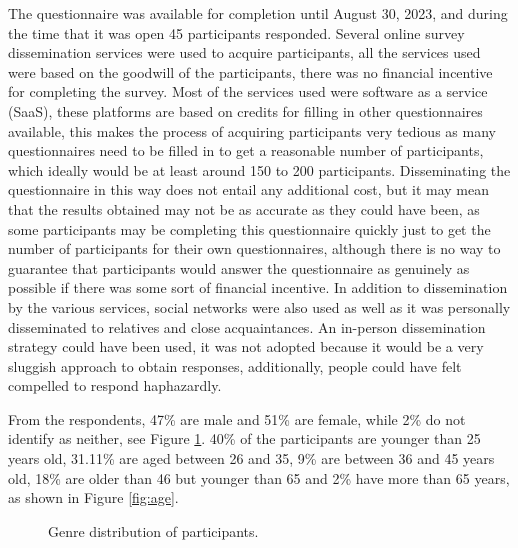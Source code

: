 The questionnaire was available for completion until August 30, 2023,
and during the time that it was open 45 participants responded.
Several online survey dissemination services were used to acquire participants,
all the services used were based on the goodwill of the participants, there
was no financial incentive for completing the survey. Most of the services
used were software as a service (SaaS), these platforms are based
on credits for filling in other questionnaires available, this makes the process
of acquiring participants very tedious as many questionnaires need to be
filled in to get a reasonable number of participants, which ideally would be
at least around 150 to 200 participants. Disseminating the questionnaire in this way does not
entail any additional cost, but it may mean that the results obtained
may not be as accurate as they could have been, as some participants may
be completing this questionnaire quickly just to get the number of participants
for their own questionnaires, although there is no way to guarantee that
participants would answer the questionnaire as genuinely as possible if there
was some sort of financial incentive. In addition to
dissemination by the various services, social networks were also used as well
as it was personally disseminated to relatives and close acquaintances.
An in-person dissemination strategy could have been used, it was not adopted
because it would be a very sluggish approach to obtain responses,
additionally, people could have felt compelled to respond haphazardly.

From the respondents, 47\% are male and 51\% are female, while 2\% do not identify
as neither, see Figure \ref{fig:genre}. 40\% of the participants are younger
than 25 years old, 31.11\% are aged between 26 and 35, 9\% are between
36 and 45 years old, 18\% are older than 46 but younger than 65 and 2\%
have more than 65 years, as shown in Figure \ref{fig:age}.

\begin{figure}[H]
    \begin{center}
        \caption{Genre distribution of participants.}
        \label{fig:genre}
    \end{center}
\end{figure}

